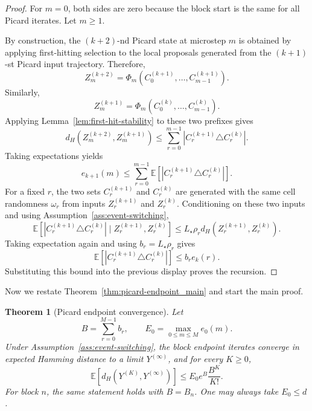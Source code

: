 \documentclass{article}
\newtheorem{theorem}{Theorem}[section]
\begin{document}
\begin{proof}
For $m=0$, both sides are zero because the block start is the same for all Picard iterates. Let $m\ge1$.

By construction, the $(k+2)$-nd Picard state at microstep $m$ is obtained by applying first-hitting selection to the local proposals generated from the $(k+1)$-st Picard input trajectory. Therefore,
\[
Z_m^{(k+2)}=\Phi_m(C_0^{(k+1)},\ldots,C_{m-1}^{(k+1)}).
\]
Similarly,
\[
Z_m^{(k+1)}=\Phi_m(C_0^{(k)},\ldots,C_{m-1}^{(k)}).
\]
Applying Lemma~\ref{lem:first-hit-stability} to these two prefixes gives
\[
d_H\left(Z_m^{(k+2)},Z_m^{(k+1)}\right)
\le
\sum_{r=0}^{m-1}|C_r^{(k+1)}\triangle C_r^{(k)}|.
\]
Taking expectations yields
\[
e_{k+1}(m)
\le
\sum_{r=0}^{m-1}\mathbb E\left[|C_r^{(k+1)}\triangle C_r^{(k)}|\right].
\]
For a fixed $r$, the two sets $C_r^{(k+1)}$ and $C_r^{(k)}$ are generated with the same cell randomness $\omega_r$ from inputs $Z_r^{(k+1)}$ and $Z_r^{(k)}$. Conditioning on these two inputs and using Assumption~\ref{ass:event-switching},
\[
\mathbb E\left[|C_r^{(k+1)}\triangle C_r^{(k)}|\mid Z_r^{(k+1)},Z_r^{(k)}\right]
\le
L_\star\rho_r d_H\left(Z_r^{(k+1)},Z_r^{(k)}\right).
\]
Taking expectation again and using $b_r=L_\star\rho_r$ gives
\[
\mathbb E\left[|C_r^{(k+1)}\triangle C_r^{(k)}|\right]
\le
b_r e_k(r).
\]
Substituting this bound into the previous display proves the recursion.
\end{proof}
Now we restate Theorem~\ref{thm:picard-endpoint_main} and start the main proof.
\begin{theorem}[Picard endpoint convergence]
\label{thm:picard-endpoint}
Let
\[
B=\sum_{r=0}^{M-1}b_r,
\qquad
E_0=\max_{0\le m\le M}e_0(m).
\]
Under Assumption~\ref{ass:event-switching}, the block endpoint iterates converge in expected Hamming distance to a limit $Y^{(\infty)}$, and for every $K\ge0$,
\[
\mathbb E\left[d_H\left(Y^{(K)},Y^{(\infty)}\right)\right]
\le
E_0 e^B\frac{B^K}{K!}.
\]
For block $n$, the same statement holds with $B=B_n$. One may always take $E_0\le d$.
\end{theorem}
\end{document}
